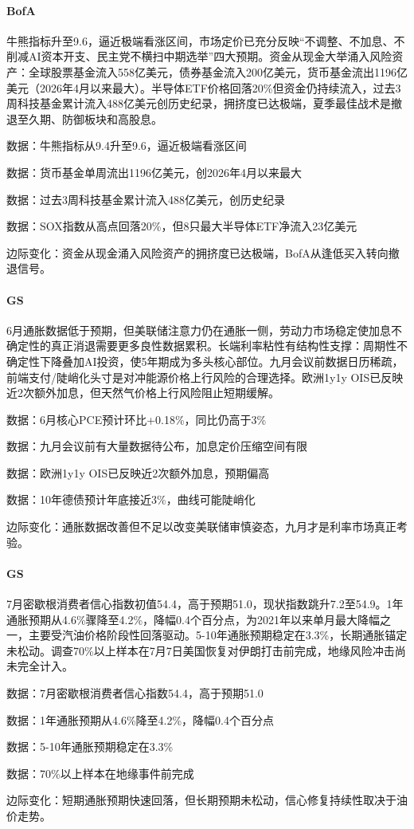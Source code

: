 \documentclass[11pt]{ctexart}
\begin{document}
\paragraph{BofA} 牛熊指标升至9.6，逼近极端看涨区间，市场定价已充分反映“不调整、不加息、不削减AI资本开支、民主党不横扫中期选举”四大预期。资金从现金大举涌入风险资产：全球股票基金流入558亿美元，债券基金流入200亿美元，货币基金流出1196亿美元（2026年4月以来最大）。半导体ETF价格回落20\%但资金仍持续流入，过去3周科技基金累计流入488亿美元创历史纪录，拥挤度已达极端，夏季最佳战术是撤退至久期、防御板块和高股息。
{\small\color{refgray}数据：牛熊指标从9.4升至9.6，逼近极端看涨区间\par}
{\small\color{refgray}数据：货币基金单周流出1196亿美元，创2026年4月以来最大\par}
{\small\color{refgray}数据：过去3周科技基金累计流入488亿美元，创历史纪录\par}
{\small\color{refgray}数据：SOX指数从高点回落20\%，但8只最大半导体ETF净流入23亿美元\par}
{\small\color{refgray}边际变化：资金从现金涌入风险资产的拥挤度已达极端，BofA从逢低买入转向撤退信号。\par}
\paragraph{GS} 6月通胀数据低于预期，但美联储注意力仍在通胀一侧，劳动力市场稳定使加息不确定性的真正消退需要更多良性数据累积。长端利率粘性有结构性支撑：周期性不确定性下降叠加AI投资，使5年期成为多头核心部位。九月会议前数据日历稀疏，前端支付/陡峭化头寸是对冲能源价格上行风险的合理选择。欧洲1y1y OIS已反映近2次额外加息，但天然气价格上行风险阻止短期缓解。
{\small\color{refgray}数据：6月核心PCE预计环比+0.18\%，同比仍高于3\%\par}
{\small\color{refgray}数据：九月会议前有大量数据待公布，加息定价压缩空间有限\par}
{\small\color{refgray}数据：欧洲1y1y OIS已反映近2次额外加息，预期偏高\par}
{\small\color{refgray}数据：10年德债预计年底接近3\%，曲线可能陡峭化\par}
{\small\color{refgray}边际变化：通胀数据改善但不足以改变美联储审慎姿态，九月才是利率市场真正考验。\par}
\paragraph{GS} 7月密歇根消费者信心指数初值54.4，高于预期51.0，现状指数跳升7.2至54.9。1年通胀预期从4.6\%骤降至4.2\%，降幅0.4个百分点，为2021年以来单月最大降幅之一，主要受汽油价格阶段性回落驱动。5-10年通胀预期稳定在3.3\%，长期通胀锚定未松动。调查70\%以上样本在7月7日美国恢复对伊朗打击前完成，地缘风险冲击尚未完全计入。
{\small\color{refgray}数据：7月密歇根消费者信心指数54.4，高于预期51.0\par}
{\small\color{refgray}数据：1年通胀预期从4.6\%降至4.2\%，降幅0.4个百分点\par}
{\small\color{refgray}数据：5-10年通胀预期稳定在3.3\%\par}
{\small\color{refgray}数据：70\%以上样本在地缘事件前完成\par}
{\small\color{refgray}边际变化：短期通胀预期快速回落，但长期预期未松动，信心修复持续性取决于油价走势。\par}
\end{document}
